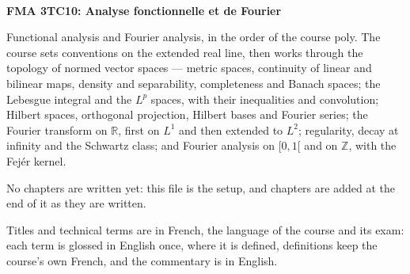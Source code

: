 \documentclass[10pt]{article}
\begin{document}
\thispagestyle{empty}
\bigskip \
\vspace{0.1cm}

\begin{center}
{\fontsize{30}{30} \selectfont \bf \sffamily FMA 3TC10: Analyse fonctionnelle et de Fourier }\\
\vspace{24pt}
\end{center}

{\parindent0pt \baselineskip=15.5pt
  Functional analysis and Fourier analysis, in the order of the course poly. The
  course sets conventions on the extended real line, then works through the topology
  of normed vector spaces --- metric spaces, continuity of linear and bilinear maps,
  density and separability, completeness and Banach spaces; the Lebesgue integral and
  the $L^p$ spaces, with their inequalities and convolution; Hilbert spaces,
  orthogonal projection, Hilbert bases and Fourier series; the Fourier transform on
  $\mathbb{R}$, first on $L^1$ and then extended to $L^2$; regularity, decay at
  infinity and the Schwartz class; and Fourier analysis on $[0,1[$ and on
  $\mathbb{Z}$, with the Fejér kernel.

  \medskip
  No chapters are written yet: this file is the setup, and chapters are added at the
  end of it as they are written.

  \medskip
  Titles and technical terms are in French, the language of the course and its exam:
  each term is glossed in English once, where it is defined, definitions keep the
  course's own French, and the commentary is in English.
}

\microtoc%
\newpage

\end{document}
